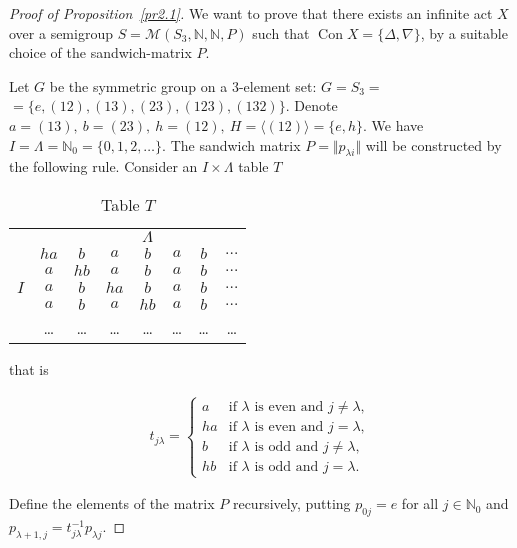 \documentclass{birkau}
\numberwithin{equation}{section}
\theoremstyle{plain}
\theoremstyle{definition}
\DeclareMathOperator{\Con}{Con}
\begin{document}
	\begin{proof}[Proof of Proposition~\ref{pr2.1}]
    	We want to prove that there exists an infinite act $X$ over a semigroup $S = \mathcal{M}(S_3, \mathbb{N}, \mathbb{N}, P)$ such that $\Con X = \{ \Delta, \nabla \}$, by a suitable choice of the sandwich-matrix $P$.
    	
    	Let $G$ be the symmetric group on a 3-element set: $G = S_3 = $ \newline $ =  \{e,(12),(13),(23),(123),(132)\}$. Denote $a = (13),\ b = (23),\ h = (12),\ H = \langle (12) \rangle = \{e,h\}$. We have $I = \Lambda = \mathbb{N}_0 = \{0,1,2,\ldots \}$. The sandwich matrix $P = \Vert p_{\lambda i} \Vert$ will be constructed by the following rule. Consider an $I \times \Lambda$ table $T$
    	\begin{table}[h]
    		\begin{center}
    			\begin{tabular}{cccccccc}
    					&  & & & $\Lambda$ & \\
    					& $ha$ & $b$ & $a$ & $b$ & $a$ & $b$ & $\dots$ \\
    					& $a$ & $hb$ & $a$ & $b$ & $a$ & $b$ & $\dots$ \\
    				$I$	& $a$ & $b$ & $ha$ & $b$ & $a$ & $b$ & $\dots$ \\
    					& $a$ & $b$ & $a$ & $hb$ & $a$ & $b$ & $\dots$ \\
    					& \ldots & \ldots & \ldots & \ldots & \ldots & \ldots & \ldots
    			\end{tabular}
    			\caption{Table $T$} \label{table1}
    		\end{center}
    		that is
    	\end{table}
    	\begin{gather*}
    		t_{j \lambda} =
    		\begin{cases}
    			a&\text{if $\lambda$ is even and } j \neq \lambda,\\
    			ha&\text{if $\lambda$ is even and } j = \lambda,\\
    			b&\text{if $\lambda$ is odd and } j \neq \lambda,\\
    			hb&\text{if $\lambda$ is odd and } j = \lambda.
    		\end{cases}
    	\end{gather*}
    	
    	Define the elements of the matrix $P$ recursively, putting $p_{0j} = e$ for all $j \in \mathbb{N}_0$ and $p_{\lambda + 1,j} = t_{j \lambda}^{-1} p_{\lambda j}$.
    	

\end{proof}
\end{document}
